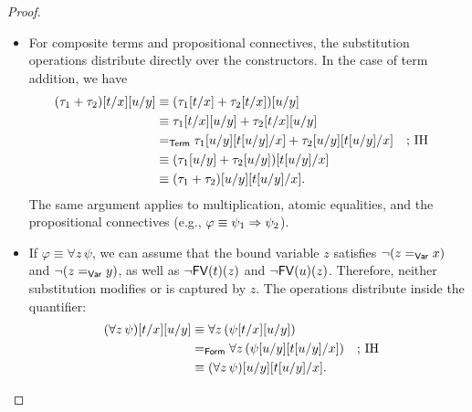 \begin{proof}
\begin{enumerate}[a),font=\upshape]
\begin{itemize}
            \item For composite terms and propositional connectives, the substitution operations distribute directly over the constructors. In the case of term addition, we have
            \begin{align*}
                (\tau_1+\tau_2)[t/x][u/y]
                    &\equiv
                        (\tau_1[t/x]+\tau_2[t/x])[u/y]\\
                    &\equiv
                        \tau_1[t/x][u/y]+\tau_2[t/x][u/y] \\
                    &\mathrel{=_{\mathsf{Term}}}
                        \tau_1[u/y][t[u/y]/x]
                        +\tau_2[u/y][t[u/y]/x]
                        &&\text{; IH}\\
                    &\equiv
                        (
                            \tau_1[u/y]+\tau_2[u/y]
                        )
                        [t[u/y]/x] \\
                    &\equiv
                        (\tau_1+\tau_2)[u/y][t[u/y]/x].
            \end{align*}
            The same argument applies to multiplication, atomic equalities, and the propositional connectives (e.g., $\varphi \equiv \psi_1 \mathrel{\Rightarrow} \psi_2$).
            
            \item If $\varphi\equiv\forall z\,\psi$, we can assume that the bound variable $z$ satisfies $\neg(z\mathrel{=_{\mathsf{Var}}}x)$ and $\neg(z\mathrel{=_{\mathsf{Var}}}y)$, as well as $\neg\mathsf{FV}(t)(z)$ and $\neg\mathsf{FV}(u)(z)$. Therefore, neither substitution modifies or is captured by $z$. The operations distribute inside the quantifier:
            \begin{align*}
                (\forall z\,\psi)[t/x][u/y]
                    &\equiv\forall z\,(\psi[t/x][u/y])\\
                    &\mathrel{=_{\mathsf{Form}}}\forall z\,(\psi[u/y][t[u/y]/x])
                        &&\text{; IH}\\
                    &\equiv(\forall z\,\psi)[u/y][t[u/y]/x].
            \end{align*}\qedhere
        \end{itemize}
    \end{enumerate}
\end{proof}

